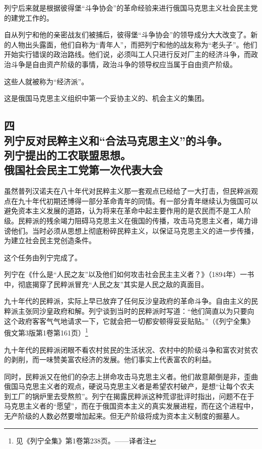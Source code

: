 列宁后来就是根据彼得堡“斗争协会”的革命经验来进行俄国马克思主义社会民主党的建党工作的。

自从列宁和他的亲密战友们被捕后，彼得堡“斗争协会”的领导成分大大改变了。新的人物出头露面，他们自称为“青年人”，而把列宁和他的战友称为“老头子”。他们开始实行错误的政治路线。他们说，必须叫工人只进行反对厂主的经济斗争，而政治斗争是自由资产阶级的事情，政治斗争的领导权应当属于自由资产阶级。

这些人就被称为“经济派”。

这是俄国马克思主义组织中第一个妥协主义的、机会主义的集团。

\subsection[四\q 列宁反对民粹主义和“合法马克思主义”的斗争。列宁提出的工农联盟思想。俄国社会民主工党第一次代表大会]{四\\ 列宁反对民粹主义和“合法马克思主义”的斗争。\\ 列宁提出的工农联盟思想。\\ 俄国社会民主工党第一次代表大会}

虽然普列汉诺夫在八十年代对民粹主义那一套观点已经给了一大打击，但民粹派观点在九十年代初期还博得一部分革命青年的同情。有一部分青年继续认为俄国可以避免资本主义发展的道路，认为将来在革命中起主要作用的是农民而不是工人阶级。民粹派的残余竭力阻碍马克思主义在俄国的传播，攻击马克思主义者，竭力诽谤他们。当时必须从思想上彻底粉碎民粹主义，以保证马克思主义的进一步传播，为建立社会民主党创造条件。

这个任务由列宁完成了。

列宁在《什么是“人民之友”以及他们如何攻击社会民主主义者？》（1894年）一书中，彻底揭穿了民粹派冒充“人民之友”其实是人民之敌的真面目。

九十年代的民粹派，实际上早已放弃了任何反沙皇政府的革命斗争。自由主义的民粹派主张同沙皇政府和解。列宁谈到当时的民粹派时写道：“他们简直以为只要向这个政府客客气气地请求一下，它就会把一切都安顿得妥妥贴贴。”（《列宁全集》俄文第3版第1卷第161页）\footnote{见《列宁全集》第1卷第238页。——译者注}

九十年代的民粹派闭眼不看农村贫民的生活状况、农村中的阶级斗争和富农对贫农的剥削，而一味赞美富农经济的发展。他们事实上代表富农的利益。

同时，民粹派又在他们的杂志上拼命攻击马克思主义者。他们故意颠倒是非，歪曲俄国马克思主义者的观点，硬说马克思主义者是希望农村破产，是想“让每个农夫到工厂的锅炉里去受熬煎”。列宁在揭露民粹派这种荒谬批评时指出，问题不在于马克思主义者的“愿望”，而在于俄国资本主义的真实发展进程，而在这个进程中，无产阶级的人数必然要增加起来。但无产阶级将成为资本主义制度的掘墓人。

